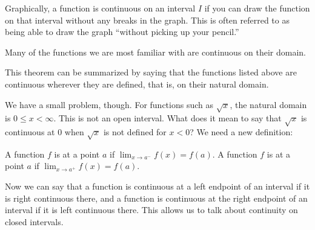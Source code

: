 \documentclass{ximera}
\begin{document}
Graphically, a function is continuous on an interval $I$ if you can
draw the function on that interval without any breaks in the graph.
This is often referred to as being able to draw the graph ``without
picking up your pencil.''

Many of the functions we are most familiar with are continuous on
their domain.


This theorem can be summarized by saying that the functions listed above are continuous wherever they are defined, that is, on their natural domain. 

We have a small problem, though.  For functions such as $\sqrt{x}$, the natural domain is $0\leq x <\infty$.  This is not an open interval.  What does it mean to say that $\sqrt{x}$ is continuous at 0 when $\sqrt{x}$ is not defined for $x<0$?  We need a new definition:

\begin{definition}
  A function $f$ is  at a point $a$ if $\lim_{x\to a^-}
  f(x) = f(a)$.   A function $f$ is  at a point $a$ if $\lim_{x\to a^+}
  f(x) = f(a)$.  
\end{definition}

Now we can say that a function is continuous at a left endpoint of an interval if it is right continuous there, and a function is continuous at the right endpoint of an interval if it is left continuous there. This allows us to talk about continuity on closed intervals.  
\end{document}
